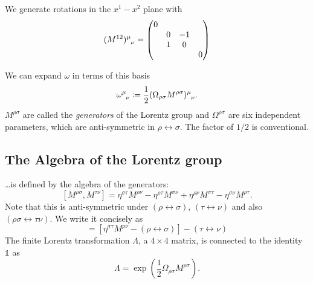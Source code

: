 \begin{example}[]
  We generate rotations in the $x^1-x^2$ plane with
  \begin{equation}
    (M^{12}) \indices{^{\mu}_{\nu}} = 
    \begin{pmatrix}
     0 &  &  &  \\
      & 0 & -1 &  \\
      & 1 & 0 &  \\
      &  &  & 0 \\
    \end{pmatrix}
  \end{equation}
\end{example}
We can expand $\omega$ in terms of this basis
\begin{equation}
  \omega \indices{^{\mu}_{\nu}} \coloneqq \frac{1}{2} (\Omega_{\rho\sigma} M^{\rho\sigma}) \indices{^{\mu}_{\nu}}.
\end{equation}
$M^{\rho\sigma}$ are called the \emph{generators} of the Lorentz group and $\Omega^{\rho\sigma}$ are six independent parameters, which are anti-symmetric in $\rho \leftrightarrow \sigma$.
The factor of $1/2$ is conventional.

\subsection{The Algebra of the Lorentz group}%
\label{sub:the_algebra_of_the_lorentz_group}

\dots is defined by the algebra of the generators:
\begin{equation}
  \label{eq:13-star}
  [M^{\rho\sigma}, M^{\tau\nu}] = \eta^{\sigma\tau} M^{\rho\nu} - \eta^{\rho\tau} M^{\sigma\nu} + \eta^{\rho\nu} M^{\sigma\tau} - \eta^{\sigma\nu} M^{\rho\tau}.
\end{equation}
Note that this is anti-symmetric under $(\rho \leftrightarrow \sigma)$, $(\tau \leftrightarrow \nu)$ and also $(\rho\sigma \leftrightarrow \tau\nu)$.
We write it concisely as
\begin{equation}
  [M^{\rho\sigma}, M^{\tau\nu}] = [ \eta^{\sigma\tau} M^{\rho\nu} - (\rho \leftrightarrow \sigma) ] - (\tau \leftrightarrow \nu)
\end{equation}
The finite Lorentz transformation $\Lambda$, a $4 \times 4$ matrix, is connected to the identity $\mathbb{1}$ as
\begin{equation}
  \Lambda = \exp(\frac{1}{2} \Omega_{\rho\sigma} M^{\rho\sigma}).
\end{equation}
